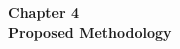 \begin{center}

    \thispagestyle{empty}
    \vspace*{\fill}
    
    \Huge 
    \textbf{Chapter 4\\ Proposed Methodology}
       

    \vspace*{\fill}
\end{center}